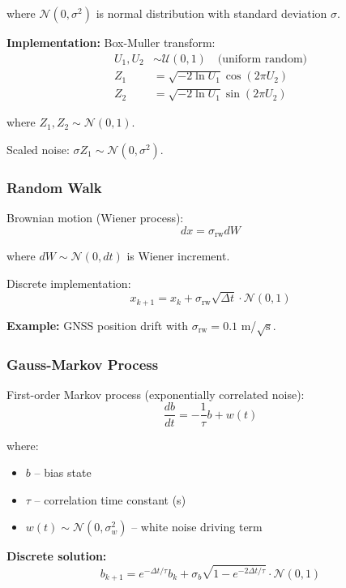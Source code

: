 \documentclass[11pt,a4paper]{article}
\begin{document}
where $\mathcal{N}(0, \sigma^2)$ is normal distribution with standard deviation $\sigma$.

\textbf{Implementation:} Box-Muller transform:
\begin{align}
U_1, U_2 &\sim \mathcal{U}(0, 1) \quad \text{(uniform random)} \\
Z_1 &= \sqrt{-2 \ln U_1} \cos(2\pi U_2) \\
Z_2 &= \sqrt{-2 \ln U_1} \sin(2\pi U_2)
\end{align}

where $Z_1, Z_2 \sim \mathcal{N}(0, 1)$.

Scaled noise: $\sigma Z_1 \sim \mathcal{N}(0, \sigma^2)$.

\subsubsection{Random Walk}

Brownian motion (Wiener process):
\begin{equation}
dx = \sigma_{\text{rw}} dW
\end{equation}

where $dW \sim \mathcal{N}(0, dt)$ is Wiener increment.

Discrete implementation:
\begin{equation}
x_{k+1} = x_k + \sigma_{\text{rw}} \sqrt{\Delta t} \cdot \mathcal{N}(0, 1)
\end{equation}

\textbf{Example:} GNSS position drift with $\sigma_{\text{rw}} = 0.1$ m/$\sqrt{\text{s}}$.

\subsubsection{Gauss-Markov Process}

First-order Markov process (exponentially correlated noise):
\begin{equation}
\frac{db}{dt} = -\frac{1}{\tau} b + w(t)
\end{equation}

where:
\begin{itemize}
    \item $b$ -- bias state
    \item $\tau$ -- correlation time constant (s)
    \item $w(t) \sim \mathcal{N}(0, \sigma_w^2)$ -- white noise driving term
\end{itemize}

\textbf{Discrete solution:}
\begin{equation}
b_{k+1} = e^{-\Delta t / \tau} b_k + \sigma_b \sqrt{1 - e^{-2\Delta t / \tau}} \cdot \mathcal{N}(0, 1)
\end{equation}
\end{document}
